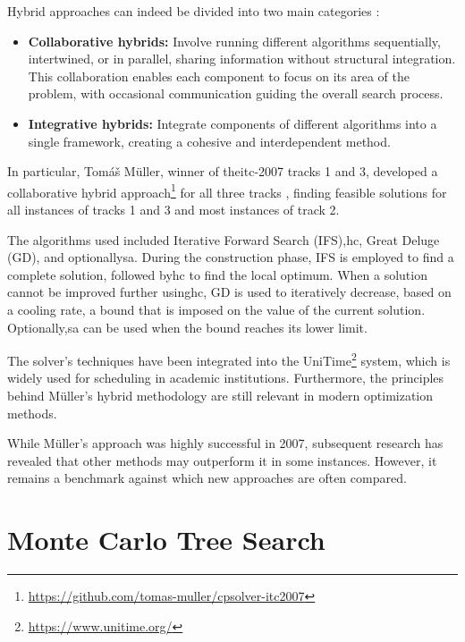 Hybrid approaches can indeed be divided into two main categories \cite{abdipoor_meta-heuristic_2023}:

\begin{itemize}
\item \textbf{Collaborative hybrids:} Involve running different algorithms sequentially, intertwined, or in parallel, sharing information without structural integration. This collaboration enables each component to focus on its area of the problem, with occasional communication guiding the overall search process.

\item \textbf{Integrative hybrids:} Integrate components of different algorithms into a single framework, creating a cohesive and interdependent method.

\end{itemize}


In particular, Tomáš Müller, winner of the\ac{itc-2007} tracks 1 and 3, developed a collaborative hybrid approach\footnote{\url{https://github.com/tomas-muller/cpsolver-itc2007}} for all three tracks \cite{muller_itc2007}, finding feasible solutions for all instances of tracks 1 and 3 and most instances of track 2. 

The algorithms used included Iterative Forward Search (IFS),\ac{hc}, Great Deluge (GD), and optionally\ac{sa}. During the construction phase, IFS is employed to find a complete solution, followed by\ac{hc} to find the local optimum. When a solution cannot be improved further using\ac{hc}, GD is used to iteratively decrease, based on a cooling rate, a bound that is imposed on the value of the current solution. Optionally,\ac{sa} can be used when the bound reaches its lower limit.

The solver's techniques have been integrated into the UniTime\footnote{\url{https://www.unitime.org/}} system, which is widely used for scheduling in academic institutions. Furthermore, the principles behind Müller's hybrid methodology are still relevant in modern optimization methods.

While Müller's approach was highly successful in 2007, subsequent research has revealed that other methods may outperform it in some instances. However, it remains a benchmark against which new approaches are often compared.

\section{Monte Carlo Tree Search}

